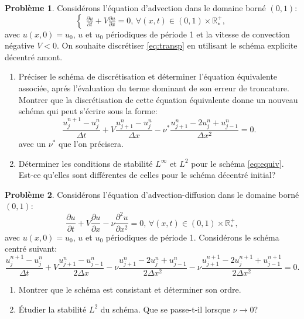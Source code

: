 \documentclass[12pt,a4paper]{article}
\begin{document}
{\bf Probl\`eme 1}. Consid\'erons l'\'equation d'advection dans le domaine born\'e $(0,1)$:
\begin{equation}\label{eq:transp}
\begin{cases}
\displaystyle\frac{\partial u}{\partial t}+V\frac{\partial u}{\partial
  x}=0,\, \forall (x,t)\in(0,1)\times\mathbb{R}^+_*,
\end{cases}
\end{equation}
avec $u(x, 0) = u_0$, $u$ et $u_0$ p\'eriodiques de p\'eriode 1 et la
vitesse de convection n\'egative $V<0$. On souhaite discr\'etiser \eqref{eq:transp}
en utilisant le sch\'ema explicite d\'ecentr\'e amont.
\begin{enumerate}
\item Pr\'eciser le sch\'ema de discr\'etisation et d\'eterminer l'\'equation \'equivalente associ\'ee,
  apr\'es l'\'evaluation du terme dominant de son erreur de
  troncature. Montrer que la discr\'etisation de cette \'equation
  \'equivalente donne un nouveau sch\'ema qui peut s'\'ecrire sous la
  forme:
\begin{equation}\label{eq:equiv}
\frac{u_j^{n+1}-u_{j}^{n}}{\Delta t}+V
\frac{u_{j+1}^{n}-u_{j}^{n}}{\Delta x}-\nu^*\frac{u_{j+1}^{n}-2u_j^n+u_{j-1}^{n}}{\Delta x^2}=0.
\end{equation}
avec un $\nu^*$ que l'on pr\'ecisera.
\item D\'eterminer les conditions de stabilit\'e $L^{\infty}$ et $L^2$
  pour le sch\'ema \eqref{eq:equiv}. Est-ce qu'elles sont
  diff\'erentes de celles pour le sch\'ema d\'ecentr\'e initial?
\end{enumerate}
{\bf Probl\`eme 2}. Consid\'erons l'\'equation d'advection-diffusion dans le domaine born\'e $(0,1)$:
\begin{equation}
\displaystyle\frac{\partial u}{\partial t}+V\frac{\partial u}{\partial
  x}-\nu\frac{\partial^2u}{\partial x^2}=0,\, \forall (x,t)\in(0,1)\times\mathbb{R}^+_*,
\end{equation}
avec $u(x, 0) = u_0$, $u$ et $u_0$ p\'eriodiques de p\'eriode 1.
Consid\'erons le sch\'ema centr\'e suivant:
$$
\frac{u_j^{n+1}-u_{j}^{n}}{\Delta t}+V
\frac{u_{j+1}^{n}-u_{j-1}^{n}}{2\Delta x}-\nu\frac{u_{j+1}^{n}-2u_j^n+u_{j-1}^{n}}{2\Delta x^2}-\nu\frac{u_{j+1}^{n+1}-2u_j^{n+1}+u_{j-1}^{n+1}}{2\Delta x^2}=0.
$$
\begin{enumerate}
\item Montrer que le sch\'ema est consistant et d\'eterminer son ordre.
\item \'Etudier la stabilit\'e $L^2$ du sch\'ema. Que se passe-t-il lorsque
$\nu \rightarrow 0$?
\end{enumerate}
\end{document}
